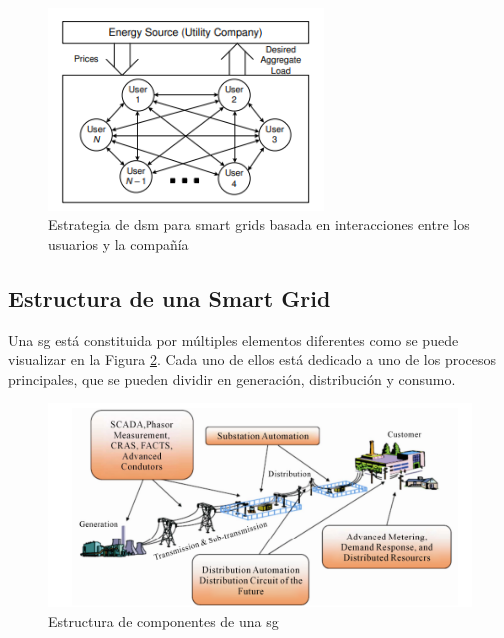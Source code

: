 \vspace{3mm}

\begin{figure}[h!]
  \centering
  \includegraphics[width=0.65\textwidth]{img/teoria/dsm2.png}
  \caption{Estrategia de \acrshort{dsm} para smart grids basada en interacciones entre los usuarios y la compañía \cite{pricing}}
  \label{fig:dsm2}
\end{figure}


\subsection{Estructura de una Smart Grid}

Una \gls{sg} está constituida por múltiples elementos diferentes como se puede visualizar en la Figura \ref{fig:estructura_sg}. Cada uno de ellos está dedicado a uno de los procesos principales, que se pueden dividir en generación, distribución y consumo. \cite{smartgrid_overview}

\begin{figure}[h!]
  \centering
  \includegraphics[width=1\textwidth]{img/teoria/estructura_sg.png}
  \caption{Estructura de componentes de una \acrshort{sg} \cite{smartgrid_overview}}
  \label{fig:estructura_sg}
\end{figure}

